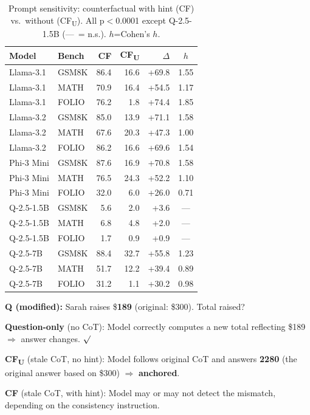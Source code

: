 \documentclass[11pt]{article}
\begin{document}
\begin{table}[t]
\centering\small
\setlength{\tabcolsep}{3pt}
\begin{tabular}{ll|rrrc}
\toprule
\textbf{Model} & \textbf{Bench} & \textbf{CF} & \textbf{CF\textsubscript{U}} & \textbf{$\Delta$} & \textbf{$h$} \\
\midrule
Llama-3.1 & GSM8K & 86.4 & 16.6 & +69.8 & 1.55 \\
Llama-3.1 & MATH & 70.9 & 16.4 & +54.5 & 1.17 \\
Llama-3.1 & FOLIO & 76.2 & 1.8 & +74.4 & 1.85 \\
Llama-3.2 & GSM8K & 85.0 & 13.9 & +71.1 & 1.58 \\
Llama-3.2 & MATH & 67.6 & 20.3 & +47.3 & 1.00 \\
Llama-3.2 & FOLIO & 86.2 & 16.6 & +69.6 & 1.54 \\
Phi-3 Mini & GSM8K & 87.6 & 16.9 & +70.8 & 1.58 \\
Phi-3 Mini & MATH & 76.5 & 24.3 & +52.2 & 1.10 \\
Phi-3 Mini & FOLIO & 32.0 & 6.0 & +26.0 & 0.71 \\
Q-2.5-1.5B & GSM8K & 5.6 & 2.0 & +3.6 & --- \\
Q-2.5-1.5B & MATH & 6.8 & 4.8 & +2.0 & --- \\
Q-2.5-1.5B & FOLIO & 1.7 & 0.9 & +0.9 & --- \\
Q-2.5-7B & GSM8K & 88.4 & 32.7 & +55.8 & 1.23 \\
Q-2.5-7B & MATH & 51.7 & 12.2 & +39.4 & 0.89 \\
Q-2.5-7B & FOLIO & 31.2 & 1.1 & +30.2 & 0.98 \\
\bottomrule
\end{tabular}
\caption{Prompt sensitivity: counterfactual with hint (CF) vs.\ without (CF\textsubscript{U}). All p$<$0.0001 except Q-2.5-1.5B (---~= n.s.). $h$=Cohen's $h$.}
\label{tab:prompt_sens}
\end{table}

\begin{tcolorbox}[colback=gray!5, colframe=gray!50, title={\small Qualitative Example: CoT Anchoring}, fonttitle=\small, boxsep=2pt, left=3pt, right=3pt, top=2pt, bottom=2pt]
\small
\textbf{Q (modified):} Sarah raises \$\textbf{189} (original: \$300). Total raised?

\textbf{Question-only} (no CoT): Model correctly computes a new total reflecting \$189 $\Rightarrow$ answer changes. $\surd$

\textbf{CF\textsubscript{U}} (stale CoT, no hint): Model follows original CoT and answers \textbf{2280} (the original answer based on \$300) $\Rightarrow$ \textbf{anchored}.

\textbf{CF} (stale CoT, with hint): Model may or may not detect the mismatch, depending on the consistency instruction.
\end{tcolorbox}
\end{document}

